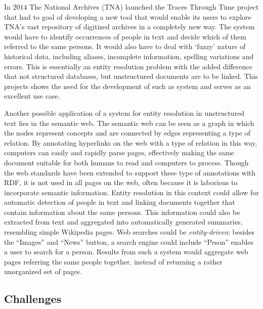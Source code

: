 \documentclass[paper=a4, fontsize=11pt]{scrartcl}
\begin{document}
In $2014$ The National Archives (TNA) launched the Traces Through Time project that had to goal of developing a new tool that would enable its users to explore TNA's vast repository of digitized archives in a completely new way.
The system would have to identify occurrences of people in text and decide which of them referred to the same persons.
It would also have to deal with `fuzzy' nature of historical data, including aliases, incomplete information, spelling variations and errors.
This is essentially an entity resolution problem with the added difference that not structured databases, but unstructured documents are to be linked.
This projects shows the need for the development of such as system and serves as an excellent use case.

Another possible application of a system for entity resolution in unstructured text lies in the semantic web.
The semantic web can be seen as a graph in which the nodes represent concepts and are connected by edges representing a type of relation.
By annotating hyperlinks on the web with a type of relation in this way, computers can easily and rapidly parse pages, effectively making the same document suitable for both humans to read and computers to process.
Though the web standards have been extended to support these type of annotations with RDF, it is not used in all pages on the web, often because it is laborious to incorporate semantic information.
Entity resolution in this context could allow for automatic detection of people in text and linking documents together that contain information about the same persons.
This information could also be extracted from text and aggregated into automatically generated summaries, resembling simple Wikipedia pages.
Web searches could be \emph{entity-driven}: besides the ``Images'' and ``News'' button, a search engine could include ``Peson'' enables a user to search for a person.
Results from such a system would aggregate web pages referring the same people together, instead of returning a rather unorganized set of pages.

\subsection{Challenges}
\label{sec:challenges}
\end{document}
